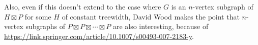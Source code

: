 \documentclass[kpfonts]{patmorin}
\begin{document}
Also, even if this doesn't extend to the case where $G$ is an $n$-vertex subgraph of $H\boxtimes P$ for some $H$ of constant treewidth, David Wood makes the point that $n$-vertex subgraphs of $P\boxtimes P\boxtimes\cdots\boxtimes P$ are also interesting, because of \url{https://link.springer.com/article/10.1007/s00493-007-2183-y}.









% 
% 
% 
% 
% 
\end{document}
